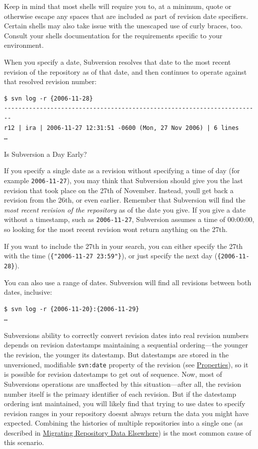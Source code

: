 Keep in mind that most shells will require you to, at a minimum, quote
or otherwise escape any spaces that are included as part of revision
date specifiers. Certain shells may also take issue with the unescaped
use of curly braces, too. Consult your shell\textquotesingle s
documentation for the requirements specific to your environment.

When you specify a date, Subversion resolves that date to the most
recent revision of the repository as of that date, and then continues to
operate against that resolved revision number:

\begin{verbatim}
$ svn log -r {2006-11-28}
------------------------------------------------------------------------
r12 | ira | 2006-11-27 12:31:51 -0600 (Mon, 27 Nov 2006) | 6 lines
…
\end{verbatim}

Is Subversion a Day Early?

If you specify a single date as a revision without specifying a time of
day (for example \texttt{2006-11-27}), you may think that Subversion
should give you the last revision that took place on the 27th of
November. Instead, you\textquotesingle ll get back a revision from the
26th, or even earlier. Remember that Subversion will find the \emph{most
recent revision of the repository} as of the date you give. If you give
a date without a timestamp, such as \texttt{2006-11-27}, Subversion
assumes a time of 00:00:00, so looking for the most recent revision
won\textquotesingle t return anything on the 27th.

If you want to include the 27th in your search, you can either specify
the 27th with the time (\texttt{\{"2006-11-27\ 23:59"\}}), or just
specify the next day (\texttt{\{2006-11-28\}}).

You can also use a range of dates. Subversion will find all revisions
between both dates, inclusive:

\begin{verbatim}
$ svn log -r {2006-11-20}:{2006-11-29}
…
\end{verbatim}

Subversion\textquotesingle s ability to correctly convert revision dates
into real revision numbers depends on revision datestamps maintaining a
sequential ordering---the younger the revision, the younger its
datestamp. But datestamps are stored in the unversioned, modifiable
\texttt{svn:date} property of the revision (see
\hyperref[svn.advanced.props]{Properties}), so it is possible for
revision datestamps to get out of sequence. Now, most of
Subversion\textquotesingle s operations are unaffected by this
situation---after all, the revision number itself is the primary
identifier of each revision. But if the datestamp ordering
isn\textquotesingle t maintained, you will likely find that trying to
use dates to specify revision ranges in your repository
doesn\textquotesingle t always return the data you might have expected.
Combining the histories of multiple repositories into a single one (as
described in \hyperref[svn.reposadmin.maint.migrate]{Migrating
Repository Data Elsewhere}) is the most common cause of this scenario.

